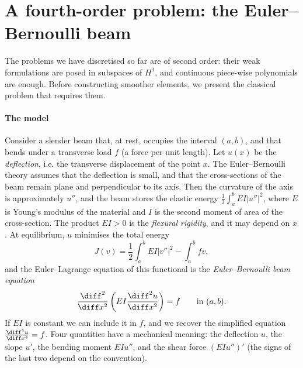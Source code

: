 \section{A fourth-order problem: the Euler--Bernoulli beam}
\label{sec:Euler-Bernoulli beam}

The problems we have discretised so far are of second order: their weak formulations are posed in subspaces of $H^1$, and continuous piece-wise polynomials are enough.
Before constructing smoother elements, we present the classical problem that requires them.

\paragraph{The model}
Consider a slender beam that, at rest, occupies the interval $(a,b)$, and that bends under a transverse load $f$ (a force per unit length).
Let $u(x)$ be the \emph{deflection}, i.e. the transverse displacement of the point $x$.
The Euler--Bernoulli theory assumes that the deflection is small, and that the cross-sections of the beam remain plane and perpendicular to its axis.
Then the curvature of the axis is approximately $u''$, and the beam stores the elastic energy $\frac 1 2 \int_a^b EI |u''|^2$, where $E$ is Young's modulus of the material and $I$ is the second moment of area of the cross-section.
The product $EI > 0$ is the \emph{flexural rigidity}, and it may depend on $x$.
At equilibrium, $u$ minimises the total energy
\begin{equation*}
    J(v) = \frac 1 2 \int_a^b EI |v''|^2 - \int_a^b f v,
\end{equation*}
and the Euler--Lagrange equation of this functional is the \emph{Euler--Bernoulli beam equation}
\begin{equation}
    \label{eq:Euler-Bernoulli beam}
    \frac{\diff^2}{\diff x^2} \left( EI \frac{\diff^2 u}{\diff x^2} \right) = f \qquad \text{in } (a,b).
\end{equation}
If $EI$ is constant we can include it in $f$, and we recover the simplified equation $\frac{\diff^4 u}{\diff x^4} = f$.
Four quantities have a mechanical meaning: the deflection $u$, the slope $u'$, the bending moment $EI u''$, and the shear force $(EI u'')'$ (the signs of the last two depend on the convention).

